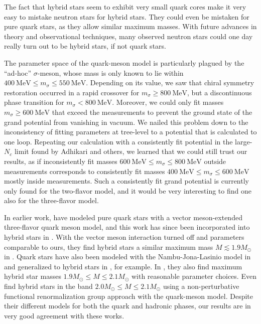 The fact that hybrid stars seem to exhibit very small quark cores
make it very easy to mistake neutron stars for hybrid stars.
They could even be mistaken for pure quark stars, as they allow similar maximum masses.
With future advances in theory and observational techniques,
many observed neutron stars could one day really turn out to be hybrid stars, if not quark stars.

The parameter space of the quark-meson model is particularly plagued by the ``ad-hoc'' $\sigma$-meson,
whose mass is only known to lie within $\SI{400}{\mega\electronvolt} \leq m_\sigma \leq \SI{550}{\mega\electronvolt}$.
Depending on its value, we saw that chiral symmetry restoration occurred in a rapid crossover for $m_\sigma \geq \SI{800}{\mega\electronvolt}$,
but a discontinuous phase transition for $m_\sigma < \SI{800}{\mega\electronvolt}$.
Moreover, we could only fit masses $m_\sigma \geq \SI{600}{\mega\electronvolt}$ that exceed the measurements
to prevent the ground state of the grand potential from vanishing in vacuum.
We nailed this problem down to the inconsistency of fitting parameters at tree-level to a potential that is calculated to one loop.
Repeating our calculation with a consistently fit potential in the large-$N_c$ limit found by Adhikari and others,
we learned that we could still trust our results,
as if inconsistently fit masses $\SI{600}{\mega\electronvolt} \leq m_\sigma \leq \SI{800}{\mega\electronvolt}$ outside measurements
corresponds to consistently fit masses $\SI{400}{\mega\electronvolt} \leq m_\sigma \leq \SI{600}{\mega\electronvolt}$ mostly inside measurements.
Such a consistently fit grand potential is currently only found for the two-flavor model,
and it would be very interesting to find one also for the three-flavor model.

In earlier work, \cite{ref:lsm3f_compact_stars} have modeled pure quark stars with a vector meson-extended three-flavor quark meson model,
and this work has since been incorporated into hybrid stars in \cite{ref:lsm3f_hybrid_stars}.
With the vector meson interaction turned off and parameters comparable to ours,
they find hybrid stars a similar maximum mass $M \lesssim 1.9 M_\odot$ in \cite[figure 8]{ref:lsm3f_hybrid_stars}. %
Quark stars have also been modeled with the Nambu-Jona-Lasinio model in \cite{ref:quark_star_njl} and generalized to hybrid stars in \cite{ref:hybrid_stars_njl}, for example.
In \cite[figure 3]{ref:hybrid_stars_njl}, they also find maximum hybrid star masses $1.9 M_\odot \leq M \leq 2.1 M_\odot$ with reasonable parameter choices.
Even \cite{ref:quark_hybrid_additional_ref} find hybrid stars in the band $2.0 M_\odot \leq M \leq 2.1 M_\odot$
using a non-perturbative functional renormalization group approach with the quark-meson model.
Despite their different models for both the quark and hadronic phases,
our results are in very good agreement with these works.

